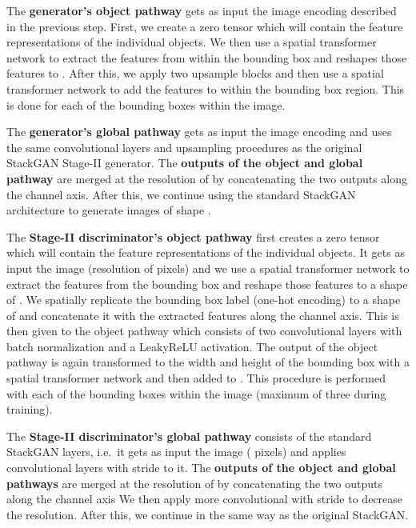 \documentclass{article} \usepackage{iclr2019_conference,times}
\begin{document}
	The \textbf{generator's object pathway} gets as input the image encoding described in the previous step.
	First, we create a zero tensor  which will contain the feature representations of the individual objects.
	We then use a spatial transformer network to extract the features from within the bounding box and reshapes those features to .
	After this, we apply two upsample blocks and then use a spatial transformer network to add the features to  within the bounding box region.
	This is done for each of the bounding boxes within the image.
	
	The \textbf{generator's global pathway} gets as input the image encoding and uses the same convolutional layers and upsampling procedures as the original StackGAN Stage-II generator.
	The \textbf{outputs of the object and global pathway} are merged at the resolution of  by concatenating the two outputs along the channel axis.
	After this, we continue using the standard StackGAN architecture to generate images of shape .
	
	The \textbf{Stage-II discriminator's object pathway} first creates a zero tensor  which will contain the feature representations of the individual objects.
	It gets as input the image (resolution of  pixels) and we use a spatial transformer network to extract the features from the bounding box and reshape those features to a shape of .
	We spatially replicate the bounding box label (one-hot encoding) to a shape of  and concatenate it with the extracted features along the channel axis.
	This is then given to the object pathway which consists of two convolutional layers with batch normalization and a LeakyReLU activation.
	The output of the object pathway is again transformed to the width and height of the bounding box with a spatial transformer network and then added to .
	This procedure is performed with each of the bounding boxes within the image (maximum of three during training).
	
	The \textbf{Stage-II discriminator's global pathway} consists of the standard StackGAN layers, i.e.\ it gets as input the image ( pixels) and applies convolutional layers with stride  to it.
	The \textbf{outputs of the object and global pathways} are merged at the resolution of  by concatenating the two outputs along the channel axis
	We then apply more convolutional with stride  to decrease the resolution.
	After this, we continue in the same way as the original StackGAN.
	
	
\end{document}
